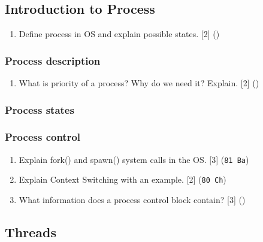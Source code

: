 \documentclass[12pt]{article}
\begin{document}
\subsection{Introduction to Process }
\begin{enumerate}[noitemsep, topsep = 0pt]
	\item Define process in OS and explain possible states. \hfill [2] ()
\end{enumerate}
\subsubsection{Process description}
\begin{enumerate}
	\item What is priority of a process? Why do we need it? Explain. \hfill [2] ()
\end{enumerate}
\subsubsection{Process states}
\subsubsection{Process control}
\begin{enumerate}[noitemsep, topsep = 0pt]
	\item Explain fork() and spawn() system calls in the OS. \hfill [3] (\texttt{81 Ba})
	
	\item Explain Context Switching with an example. \hfill [2] (\texttt{80 Ch})
	
	\item What information does a process control block contain? \hfill [3] ()
\end{enumerate}
\subsection{Threads}
\end{document}
